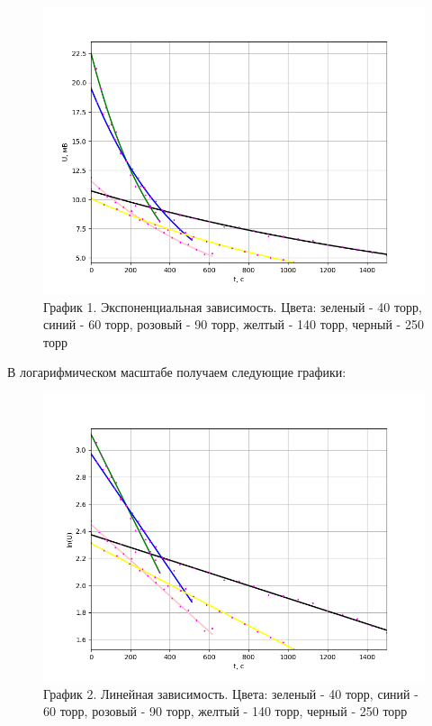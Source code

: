 \documentclass[a4paper,12pt]{article} %
\begin{document}
\begin{enumerate}
\begin{figure}[h!]
	\centering
	\includegraphics[scale=0.8]{Все(эксп).png}
	\caption*{График 1. Экспоненциальная зависимость. Цвета: зеленый - 40 торр, синий - 60 торр, розовый - 90 торр, желтый - 140 торр, черный - 250 торр}
\end{figure}
\vspace{10mm}
\newpage
В логарифмическом масштабе получаем следующие графики:
\begin{figure}[h!]
	\centering
	\includegraphics[scale=0.8]{Все(лин).png}
	\caption*{График 2. Линейная зависимость. Цвета: зеленый - 40 торр, синий - 60 торр, розовый - 90 торр, желтый - 140 торр, черный - 250 торр}
\end{figure}


\end{enumerate}
\end{document}
